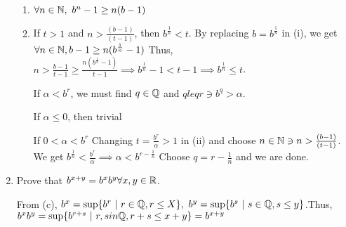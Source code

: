 \begin{solution}
\begin{enumerate}
			\begin{enumerate}
				\item $\forall n \in \mathbb{N},~b^n - 1 \geq n(b - 1)$
				\item If $t>1$ and $n > \frac{(b-1)}{(t-1)}$, then $b^{\frac{1}{n}} < t$. By replacing $b = b^{\frac{1}{n}}$ in (i), we get $\forall n \in \mathbb{N}, b-1 \geq n(b^{\frac{1}{n}} - 1)$ Thus, $n > \frac{b - 1}{t - 1} \geq \frac{n(b^{\frac{1}{n}} - 1)}{t-1} \implies b^{\frac{1}{n}} - 1 < t - 1\implies b^{\frac{1}{n}} \leq t$. 
				
				If $\alpha < b^r$, we must find $q \in \mathbb{Q}$ and $q leq r \ni b^q > \alpha$.
				
				If $\alpha \leq 0$, then trivial
				
				If $0 < \alpha < b^r$ Changing $t = \frac{b^r}{\alpha} > 1$ in (ii) and choose $n \in \mathbb{N} \ni n > \frac{(b - 1)}{(t - 1)}$. We get $b^{\frac{1}{n}} < \frac{b^r}{\alpha} \implies \alpha < b^{r - \frac{1}{n}}$ Choose $q = r - \frac{1}{n}$ and we are done.
			\end{enumerate}
			\item Prove that $b^{x + y} = b^{x}b^{y} \forall x,y \in \mathbb{R}$. 
			
			From (c), $b^x = \sup\{b^r ~|~ r \in \mathbb{Q}, r\leq X\},~ b^y = \sup\{b^s~|~ s \in \mathbb{Q}, s \leq y\}$.Thus, $b^xb^y = \sup \{b^{r+s}~|~r,s in \mathbb{Q}, r+s \leq x+y\} = b^{x+y}$
	\end{enumerate}
\end{solution}
